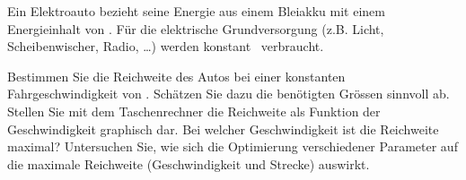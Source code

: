Ein Elektroauto bezieht seine Energie aus einem Bleiakku mit einem Energieinhalt von \EakO. Für die elektrische Grundversorgung (z.B. Licht, Scheibenwischer, Radio, \dots) werden konstant \PgvO\ verbraucht.

\begin{abcliste}
\abc Bestimmen Sie die Reichweite des Autos bei einer konstanten Fahrgeschwindigkeit von \vfaO. Schätzen Sie dazu die benötigten Grössen sinnvoll ab.
\abc Stellen Sie mit dem Taschenrechner die Reichweite als Funktion der Geschwindigkeit graphisch dar. Bei welcher Geschwindigkeit ist die Reichweite maximal?
\abc Untersuchen Sie, wie sich die Optimierung verschiedener Parameter auf die maximale Reichweite (Geschwindigkeit und Strecke) auswirkt.
\end{abcliste}
